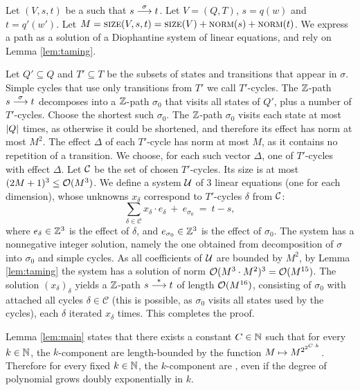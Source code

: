 \begin{appendixproof}
Let $(V, s, t)$ be a \tzvass such that $s\stackrel{\sigma}{\longrightarrow} t$.
Let $V=(Q,T)$, $s=q(w)$ and $t=q'(w')$.
Let $M = \textsc{size}(V, s, t) = \textsc{size}(V) + \textsc{norm}(s) + \textsc{norm}(t)$.
We express a path as a solution of a Diophantine system of linear equations, and rely
on Lemma \ref{lem:taming}.

Let $Q'\subseteq Q$ and $T'\subseteq T$ be the subsets of states and transitions that appear in $\sigma$.
Simple cycles that use only transitions from $T'$ we call $T'$-cycles.
The $\mathbb{Z}$-path $s\stackrel{\sigma}{\longrightarrow} t$ decomposes into a $\mathbb{Z}$-path $\sigma_0$ that visits all states of $Q'$,
plus a number of $T'$-cycles.
Choose the shortest such $\sigma_0$.
The $\mathbb{Z}$-path $\sigma_0$ visits each state at most $\left|Q\right|$ times, as otherwise it could be shortened,
and therefore its effect has norm at most $M^2$.
The effect $\Delta$ of each $T'$-cycle has norm at most $M$, as it contains no repetition of a transition.
We choose, for each such vector $\Delta$, one of $T'$-cycles with effect $\Delta$.
Let $\cal C$ be the set of chosen $T'$-cycles. 
Its size is at most $(2M+1)^3 \leq {\cal O}(M^3)$.
We define a system $\cal U$
of 3 linear equations (one for each dimension), whose unknowns $x_\delta$ correspond to $T'$-cycles $\delta$ from $\cal C$:
\[
\sum_{\delta\in \mathcal{C}} x_{\delta} \cdot e_\delta \ + \ e_{\sigma_0} \ = \ t - s,
\]
where $e_\delta\in\mathbb{Z}^3$ is the effect of $\delta$, 
and $e_{\sigma_0}\in\mathbb{Z}^3$ is the effect of $\sigma_0$.
The system has a nonnegative integer solution, namely the one obtained from decomposition of $\sigma$
into $\sigma_0$ and simple cycles.
As all coefficients of $\cal U$ are bounded by $M^2$,
by Lemma \ref{lem:taming} the system has a solution of norm ${\cal O}(M^3\cdot M^2)^3={\cal O}(M^{15})$.
The solution $(x_\delta)_\delta$ 
yields a $\mathbb{Z}$-path $s\stackrel{*}{\longrightarrow} t$ of length ${\cal O}(M^{16})$, consisting of $\sigma_0$ with
attached all cycles $\delta\in\mathcal{C}$
(this is possible, as $\sigma_0$ visits all states used by the cycles),
each $\delta$ iterated $x_\delta$ times.
This completes the proof.
\end{appendixproof}
%
Lemma \ref{lem:main} states that there exists a constant $C\in\mathbb{N}$ such that
for every $k\in\mathbb{N}$, the $k$-component \tvass are 
length-bounded by the function $M\mapsto {M}^{2^{2^{C\cdot k}}}$.
Therefore for every fixed $k\in\mathbb{N}$, the $k$-component \tvass are \plb,
even if the degree of polynomial grows doubly exponentially in $k$.

